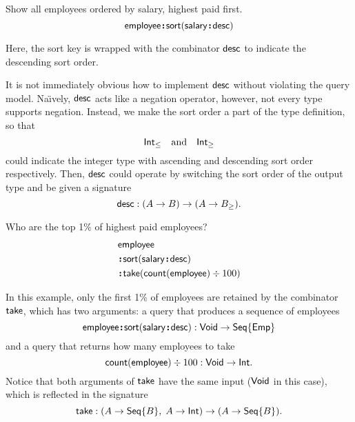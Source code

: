 \begin{demo}
    \label{ex:sort-employee-by-salary-desc}
    Show all employees ordered by salary, highest paid first.
    \begin{equation*}
        \mathsf{employee}\!\boldsymbol{:}\!\mathsf{sort}(\mathsf{salary}\!\boldsymbol{:}\!\mathsf{desc})
    \end{equation*}
\end{demo}

Here, the sort key is wrapped with the combinator $\mathsf{desc}$ to indicate the
descending sort order.

It is not immediately obvious how to implement $\mathsf{desc}$ without violating the
query model.  Na\"{\i}vely, $\mathsf{desc}$ acts like a negation operator, however, not
every type supports negation.  Instead, we make the sort order a part of the
type definition, so that
\begin{equation*}
    \mathsf{Int}_{\le} \quad\text{and}\quad \mathsf{Int}_{\ge}
\end{equation*}
could indicate the integer type with ascending and descending sort order
respectively.  Then, $\mathsf{desc}$ could operate by switching the sort order of the
output type and be given a signature
\begin{equation*}
    \mathsf{desc} : (A \to B) \to (A \to B_{\ge}).
\end{equation*}

\begin{demo}
    \label{ex:sort-employee-by-salary-take-top}
    Who are the top 1\% of highest paid employees?
    \begin{align*}
        & \mathsf{employee} \\
        & \!\boldsymbol{:}\!\mathsf{sort}(\mathsf{salary}\!\boldsymbol{:}\!\mathsf{desc}) \\
        & \!\boldsymbol{:}\!\mathsf{take}(\mathsf{count}(\mathsf{employee})\mathbin \div 100)
    \end{align*}
\end{demo}

In this example, only the first 1\% of employees are retained by the combinator
$\mathsf{take}$, which has two arguments: a query that produces a sequence of employees
\begin{equation*}
    \mathsf{employee}\!\boldsymbol{:}\!\mathsf{sort}(\mathsf{salary}\!\boldsymbol{:}\!\mathsf{desc}) : \mathsf{Void} \to \mathsf{Seq}{\left\{\mathsf{Emp}\right\}}
\end{equation*}
and a query that returns how many employees to take
\begin{equation*}
    \mathsf{count}(\mathsf{employee}) \div 100 : \mathsf{Void} \to \mathsf{Int}.
\end{equation*}
Notice that both arguments of $\mathsf{take}$ have the same input ($\mathsf{Void}$ in this
case), which is reflected in the signature
\begin{equation*}
    \mathsf{take} : (A \to \mathsf{Seq}{\left\{B\right\}},\; A \to \mathsf{Int}) \to (A \to \mathsf{Seq}{\left\{B\right\}}).
\end{equation*}

